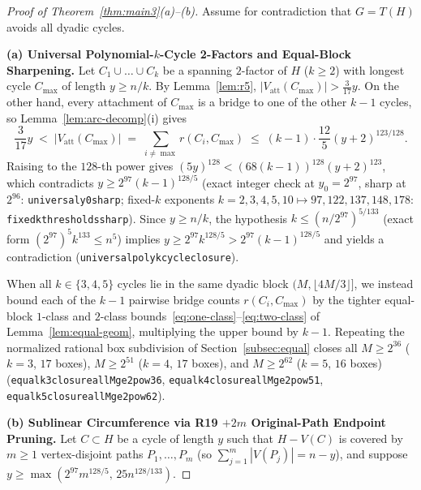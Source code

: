 \documentclass[11pt,reqno]{amsart}
\theoremstyle{plain}
\theoremstyle{definition}
\theoremstyle{remark}
\newcommand{\Vatt}{V_{\mathrm{att}}}
\DeclareRobustCommand{\_}{\ifmmode\text{\textunderscore}\else\textunderscore\allowbreak\fi}
\begin{document}
\begin{proof}[Proof of Theorem~\ref{thm:main3}(a)--(b)]
Assume for contradiction that $G = T(H)$ avoids all dyadic cycles.

\medskip
\noindent\textbf{(a) Universal Polynomial-$k$-Cycle 2-Factors and Equal-Block Sharpening.}
Let $C_1 \cup \dots \cup C_k$ be a spanning $2$-factor of $H$ ($k \ge 2$) with longest cycle $C_{\max}$ of length $y \ge n/k$. By Lemma~\ref{lem:r5}, $|\Vatt(C_{\max})| > \frac{3}{17} y$. On the other hand, every attachment of $C_{\max}$ is a bridge to one of the other $k - 1$ cycles, so Lemma~\ref{lem:arc-decomp}(i) gives
\[
  \frac{3}{17} y \;<\; |\Vatt(C_{\max})| \;=\; \sum_{i \neq \max} r(C_i, C_{\max}) \;\le\; (k - 1) \cdot \frac{12}{5}(y + 2)^{123/128}.
\]
Raising to the $128$-th power gives $(5 y)^{128} < (68(k - 1))^{128} (y + 2)^{123}$, which contradicts $y \ge 2^{97}(k - 1)^{128/5}$ (exact integer check at $y_0 = 2^{97}$, sharp at $2^{96}$: \texttt{universal\_y0\_97\_sharp}; fixed-$k$ exponents $k = 2, 3, 4, 5, 10 \mapsto 97, 122, 137, 148, 178$: \texttt{fixed\_k\_thresholds\_sharp}). Since $y \ge n/k$, the hypothesis $k \le (n / 2^{97})^{5/133}$ (exact form $(2^{97})^5 k^{133} \le n^5$) implies $y \ge 2^{97} k^{128/5} > 2^{97}(k - 1)^{128/5}$ and yields a contradiction (\texttt{universal\_poly\_k\_cycle\_closure}).

When all $k \in \{3, 4, 5\}$ cycles lie in the same dyadic block $(M, \lfloor 4M/3 \rfloor]$, we instead bound each of the $k - 1$ pairwise bridge counts $r(C_i, C_{\max})$ by the tighter equal-block $1$-class and $2$-class bounds~\eqref{eq:one-class}--\eqref{eq:two-class} of Lemma~\ref{lem:equal-geom}, multiplying the upper bound by $k - 1$. Repeating the normalized rational box subdivision of Section~\ref{subsec:equal} closes all $M \ge 2^{36}$ ($k = 3$, $17$ boxes), $M \ge 2^{51}$ ($k = 4$, $17$ boxes), and $M \ge 2^{62}$ ($k = 5$, $16$ boxes) (\texttt{equal\_k3\_closure\_all\_M\_ge\_2pow36}, \texttt{equal\_k4\_closure\_all\_M\_ge\_2pow51}, \texttt{equal\_k5\_closure\_all\_M\_ge\_2pow62}).

\medskip
\noindent\textbf{(b) Sublinear Circumference via R19 $+2m$ Original-Path Endpoint Pruning.}
Let $C \subset H$ be a cycle of length $y$ such that $H - V(C)$ is covered by $m \ge 1$ vertex-disjoint paths $P_1, \dots, P_m$ (so $\sum_{j=1}^m |V(P_j)| = n - y$), and suppose $y \ge \max(2^{97} m^{128/5},\, 25 n^{128/133})$.


\end{proof}
\end{document}
